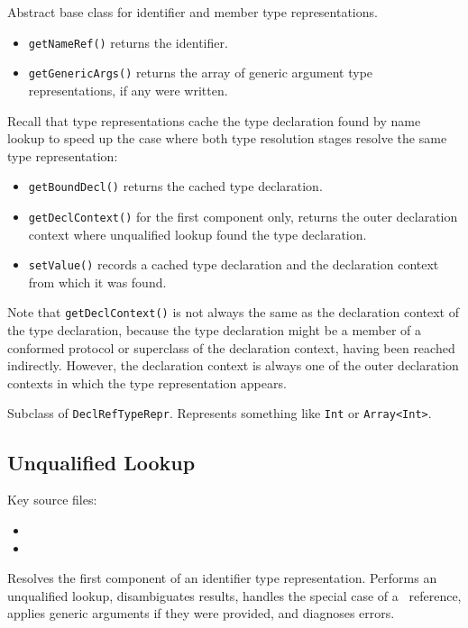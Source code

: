 \documentclass[../generics]{subfiles}
\begin{document}
Abstract base class for identifier and member type representations.
\begin{itemize}
\item \texttt{getNameRef()} returns the identifier.
\item \texttt{getGenericArgs()} returns the array of generic argument type representations, if any were written.
\end{itemize}
Recall that type representations cache the type declaration found by name lookup to speed up the case where both type resolution stages resolve the same type representation:
\begin{itemize}
\item \texttt{getBoundDecl()} returns the cached type declaration.
\item \texttt{getDeclContext()} for the first component only, returns the outer declaration context where unqualified lookup found the type declaration.
\item \texttt{setValue()} records a cached type declaration and the declaration context from which it was found.
\end{itemize}
Note that \texttt{getDeclContext()} is not always the same as the declaration context of the type declaration, because the type declaration might be a member of a conformed protocol or superclass of the declaration context, having been reached indirectly. However, the declaration context is always one of the outer declaration contexts in which the type representation appears.

Subclass of \texttt{DeclRefTypeRepr}. Represents something like \texttt{Int} or \texttt{Array<Int>}.

\subsection*{Unqualified Lookup}

Key source files:
\begin{itemize}
\item {}
\item {}
\end{itemize}

Resolves the first component of an identifier type representation. Performs an unqualified lookup, disambiguates results, handles the special case of a \tSelf\ reference, applies generic arguments if they were provided, and diagnoses errors.
\end{document}
